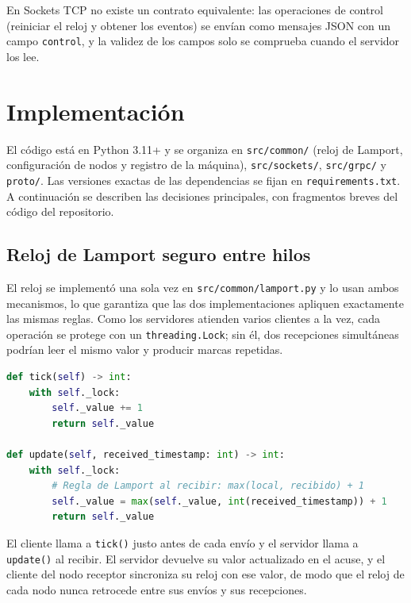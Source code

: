 \documentclass[12pt,a4paper]{article}
\begin{document}
En Sockets TCP no existe un contrato equivalente: las operaciones de control (reiniciar el reloj y obtener los eventos) se envían como mensajes JSON con un campo \texttt{control}, y la validez de los campos solo se comprueba cuando el servidor los lee.

\section{Implementación}
\label{sec:implementacion}

El código está en Python 3.11+ y se organiza en \texttt{src/common/} (reloj de Lamport, configuración de nodos y registro de la máquina), \texttt{src/sockets/}, \texttt{src/grpc/} y \texttt{proto/}. Las versiones exactas de las dependencias se fijan en \texttt{requirements.txt}. A continuación se describen las decisiones principales, con fragmentos breves del código del repositorio.

\subsection{Reloj de Lamport seguro entre hilos}

El reloj se implementó una sola vez en \texttt{src/common/lamport.py} y lo usan ambos mecanismos, lo que garantiza que las dos implementaciones apliquen exactamente las mismas reglas. Como los servidores atienden varios clientes a la vez, cada operación se protege con un \texttt{threading.Lock}; sin él, dos recepciones simultáneas podrían leer el mismo valor y producir marcas repetidas.

\begin{lstlisting}[language=Python, caption={Reglas del reloj en \texttt{src/common/lamport.py}.}, label={lst:lamport}]
def tick(self) -> int:
    with self._lock:
        self._value += 1
        return self._value

def update(self, received_timestamp: int) -> int:
    with self._lock:
        # Regla de Lamport al recibir: max(local, recibido) + 1
        self._value = max(self._value, int(received_timestamp)) + 1
        return self._value
\end{lstlisting}

El cliente llama a \texttt{tick()} justo antes de cada envío y el servidor llama a \texttt{update()} al recibir. El servidor devuelve su valor actualizado en el acuse, y el cliente del nodo receptor sincroniza su reloj con ese valor, de modo que el reloj de cada nodo nunca retrocede entre sus envíos y sus recepciones.
\end{document}
